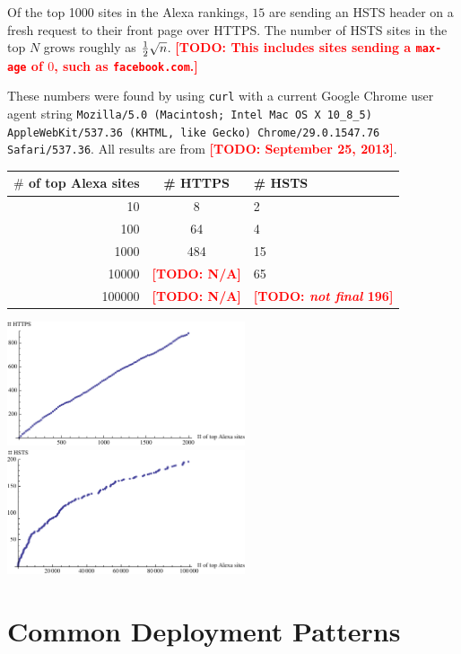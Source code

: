\documentclass[conference]{./IEEEtran}
\newcommand{\todo}[1]{\textcolor{red}{\textbf{[TODO: #1]}}}
\newcommand{\td}[2]{\textcolor{red}{\textbf{[TODO: {\it{#1}} #2]}}}
\newcommand{\site}[1]{\texttt{#1}}
\newcommand{\code}[1]{\texttt{#1}}
\theoremstyle{plain}
\begin{document}
Of the top 1000 sites in the Alexa rankings, $15$ are sending an HSTS header on a fresh request to their front page over HTTPS. The number of HSTS sites in the top $N$ grows roughly as ${1 \over 2}\sqrt{n}$. \todo{This includes sites sending a \code{max-age} of $0$, such as \site{facebook.com}.}

These numbers were found by using \code{curl} with a current Google Chrome user agent string \code{Mozilla/5.0 (Macintosh; Intel Mac OS X 10\_8\_5) AppleWebKit/537.36 (KHTML, like Gecko) Chrome/29.0.1547.76 Safari/537.36}. All results are from \todo{September 25, 2013}.

\begin{table}[htdp]
\label{alexa_table}
\begin{center}
\begin{tabular}{|r|c|l|}
\hline
$\#$ of top Alexa sites & \# HTTPS & \# HSTS\\
\hline
10 & 8 & 2 \\
\hline
100 & 64 & 4 \\	
\hline
1000 & 484 &15 \\
\hline
10000 & \todo{N/A} & 65\\
\hline
100000 & \todo{N/A} & \td{not final}{196}\\
\hline
\end{tabular}
\end{center}
\end{table}%

\begin{center}
\includegraphics[width=70mm]{alexa_https.pdf}
\includegraphics[width=70mm]{alexa_hsts.pdf}
\end{center}

\section{Common Deployment Patterns}
\end{document}
